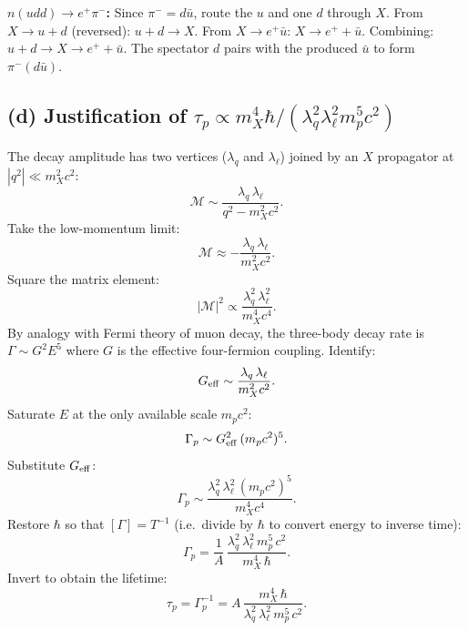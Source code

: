 \documentclass[11pt]{article}
\begin{document}
\textbf{$n(udd)\to e^+ \pi^-$:} Since $\pi^-=d\bar u$, route the $u$ and one $d$ through $X$. From $X\to u+d$ (reversed): $u+d\to X$. From $X\to e^+\bar u$: $X\to e^+ + \bar u$. Combining: $u + d \to X \to e^+ + \bar u$. The spectator $d$ pairs with the produced $\bar u$ to form $\pi^-(d\bar u)$.

\begin{center}
\end{center}

\subsection*{(d) Justification of $\tau_p\propto m_X^4\hbar/(\lambda_q^2\lambda_\ell^2 m_p^5 c^2)$}

The decay amplitude has two vertices ($\lambda_q$ and $\lambda_\ell$) joined by an $X$ propagator at $|q^2|\ll m_X^2 c^2$:
\[ \mathcal{M} \sim \frac{\lambda_q\,\lambda_\ell}{q^2 - m_X^2 c^2}. \]
Take the low-momentum limit:
\[ \mathcal{M} \approx -\frac{\lambda_q\,\lambda_\ell}{m_X^2 c^2}. \]
Square the matrix element:
\[ |\mathcal M|^2 \propto \frac{\lambda_q^2\,\lambda_\ell^2}{m_X^4 c^4}. \]
By analogy with Fermi theory of muon decay, the three-body decay rate is $\Gamma \sim G^2 E^5$ where $G$ is the effective four-fermion coupling. Identify:
\[ G_{\rm eff} \sim \frac{\lambda_q\,\lambda_\ell}{m_X^2 c^2}. \]
Saturate $E$ at the only available scale $m_p c^2$:
\[ \Gamma_p \sim G_{\rm eff}^2\,(m_p c^2)^5. \]
Substitute $G_{\rm eff}$:
\[ \Gamma_p \sim \frac{\lambda_q^2\,\lambda_\ell^2\,(m_p c^2)^5}{m_X^4 c^4}. \]
Restore $\hbar$ so that $[\Gamma]=T^{-1}$ (i.e.\ divide by $\hbar$ to convert energy to inverse time):
\[ \Gamma_p = \frac{1}{A}\,\frac{\lambda_q^2\,\lambda_\ell^2\,m_p^5\,c^2}{m_X^4\,\hbar}. \]
Invert to obtain the lifetime:
\[ \boxed{\;\tau_p = \Gamma_p^{-1} = A\,\frac{m_X^4\,\hbar}{\lambda_q^2\,\lambda_\ell^2\,m_p^5\,c^2}.\;} \]
\end{document}
